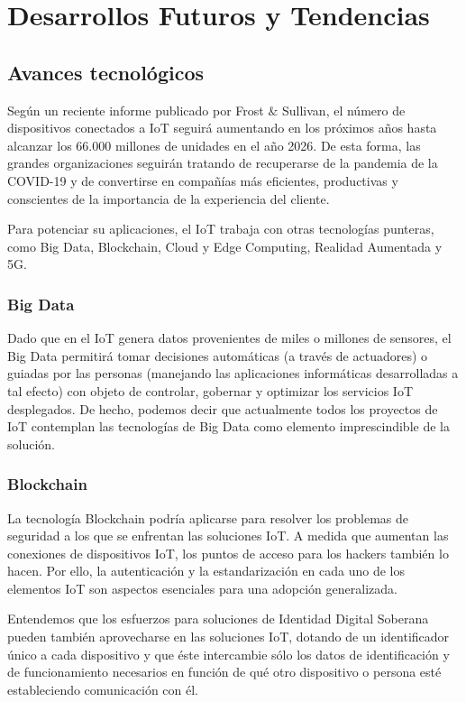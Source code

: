 \documentclass[12pt]{article}
\begin{document}
  \section*{Desarrollos Futuros y Tendencias}
  \subsection*{Avances tecnológicos}
  Según un reciente informe publicado por Frost $\&$ Sullivan, el número de dispositivos conectados a IoT seguirá aumentando en los próximos años hasta alcanzar los 66.000 millones de unidades en el año 2026. De esta forma, las grandes organizaciones seguirán tratando de recuperarse de la pandemia de la COVID-19 y de convertirse en compañías más eficientes, productivas y conscientes de la importancia de la experiencia del cliente.

  Para potenciar su aplicaciones, el IoT trabaja con otras tecnologías punteras, como Big Data, Blockchain, Cloud y Edge Computing, Realidad Aumentada y 5G.

  \subsubsection*{Big Data}
  Dado que en el IoT genera datos provenientes de miles o millones de sensores, el Big Data permitirá tomar decisiones automáticas (a través de actuadores) o guiadas por las personas (manejando las aplicaciones informáticas desarrolladas a tal efecto) con objeto de controlar, gobernar y optimizar los servicios IoT desplegados. De hecho, podemos decir que actualmente todos los proyectos de IoT contemplan las tecnologías de Big Data como elemento imprescindible de la solución.

  \subsubsection*{Blockchain}
  La tecnología Blockchain podría aplicarse para resolver los problemas de seguridad a los que se enfrentan las soluciones IoT. A medida que aumentan las conexiones de dispositivos IoT, los puntos de acceso para los hackers también lo hacen. Por ello, la autenticación y la estandarización en cada uno de los elementos IoT son aspectos esenciales para una adopción generalizada.

  Entendemos que los esfuerzos para soluciones de Identidad Digital Soberana pueden también aprovecharse en las soluciones IoT, dotando de un identificador único a cada dispositivo y que éste intercambie sólo los datos de identificación y de funcionamiento necesarios en función de qué otro dispositivo o persona esté estableciendo comunicación con él.
\end{document}
